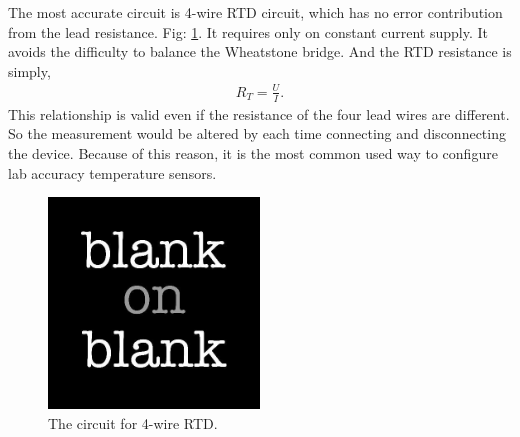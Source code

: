 The most accurate circuit is 4-wire RTD circuit, which has no error contribution from the lead resistance. Fig: \ref{fig: 4-wire circuit}. It requires only on constant current supply. It avoids the difficulty to balance the Wheatstone bridge. And the RTD resistance is simply, 
\begin{align}
R_T = \frac{U}{I}.
\end{align}
This relationship is valid even if the resistance of the four lead wires are different. So the measurement would be altered by each time connecting and disconnecting the device. Because of this reason, it is the most common used way to configure lab accuracy temperature sensors.
\begin{figure}[h!]
  \centering
  \includegraphics[width=0.5\textwidth]
  {blank.jpg}
  \caption{The circuit for 4-wire RTD.}
  \label{fig: 4-wire circuit}
\end{figure} 
